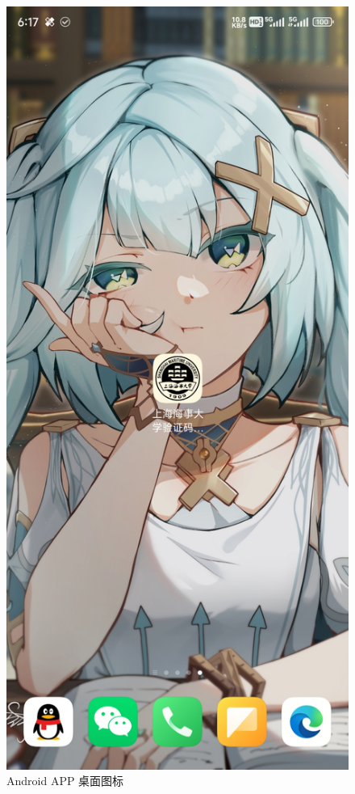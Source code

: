 \begin{figure}
	\centering
	\includegraphics[width=0.6\linewidth]{Resources/Picture/Deploy/Android/android_desktop}
	\caption{Android APP 桌面图标}
	\label{fig:androiddesktop}
\end{figure}

